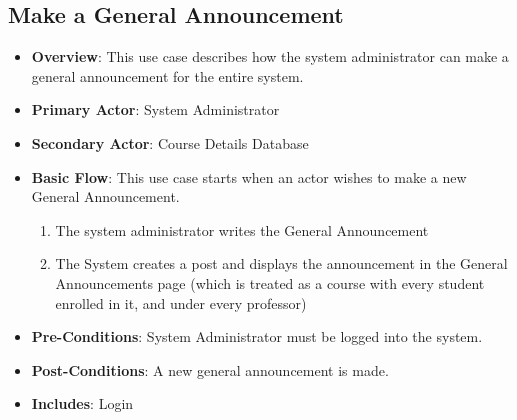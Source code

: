 \documentclass[12pt, a4]{article}
\begin{document}
\subsection{Make a General Announcement}
\begin{itemize}
    \item \textbf{Overview}: This use case describes how the system administrator can make a general announcement for the entire system.
    \item \textbf{Primary Actor}: System Administrator
    \item \textbf{Secondary Actor}: Course Details Database
    \item \textbf{Basic Flow}: This use case starts when an actor wishes to make a new General Announcement.
        \begin{enumerate}
            \item The system administrator writes the General Announcement
            \item The System creates a post and displays the announcement in the General Announcements page (which is treated as a course with every student enrolled in it, and under every professor)
        \end{enumerate}
    \item \textbf{Pre-Conditions}: System Administrator must be logged into the system.
    \item \textbf{Post-Conditions}: A new general announcement is made.
    \item \textbf{Includes}: Login
\end{itemize}

\end{document}
